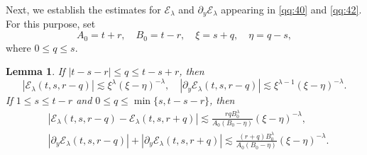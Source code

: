 \documentclass[11pt,twoside]{article}
\newcommand{\p}{\partial}
\newcommand{\f}{\frac}
\newcommand{\Ecal}{\mathcal E}
\theoremstyle{plain}
\newtheorem{lemma}[theorem]{Lemma}
\theoremstyle{definition}
\theoremstyle{remark}
\numberwithin{equation}{section}
\begin{document}
Next, we establish the estimates for $\Ecal_\lambda$ and
$\p_y\Ecal_\lambda$ appearing in \eqref{qq:40} and \eqref{qq:42}.
For this purpose, set
\begin{equation}
\label{qq:44}
A_0=t+r,\quad B_0=t-r,\quad
\xi=s+q,\quad \eta=q-s,
\end{equation}
where $0\leq q\leq s$.

\begin{lemma}
\label{lem:characteristic-kernel}
If $|t-s-r|\leq q\leq t-s+r$, then
\begin{equation}
\label{qq:45}
|\Ecal_\lambda(t,s,r-q)|
\lesssim
\xi^\lambda(\xi-\eta)^{-\lambda},
\quad
|\p_y\Ecal_\lambda(t,s,r-q)|
\lesssim
\xi^{\lambda-1}(\xi-\eta)^{-\lambda}.
\end{equation}
If $1\leq s\leq t-r$ and $0\leq q\leq\min\{s,t-s-r\}$, then
\begin{equation}
\label{qq:46}
\begin{aligned}
&
\left|
\Ecal_\lambda(t,s,r-q)
-
\Ecal_\lambda(t,s,r+q)
\right|
\lesssim
\f{rqB_0^\lambda}{A_0(B_0-\eta)}
(\xi-\eta)^{-\lambda},\\
&
|\p_y\Ecal_\lambda(t,s,r-q)|
+
|\p_y\Ecal_\lambda(t,s,r+q)|
\lesssim
\f{(r+q)B_0^\lambda}{A_0(B_0-\eta)}
(\xi-\eta)^{-\lambda}.
\end{aligned}
\end{equation}
\end{lemma}
\end{document}
